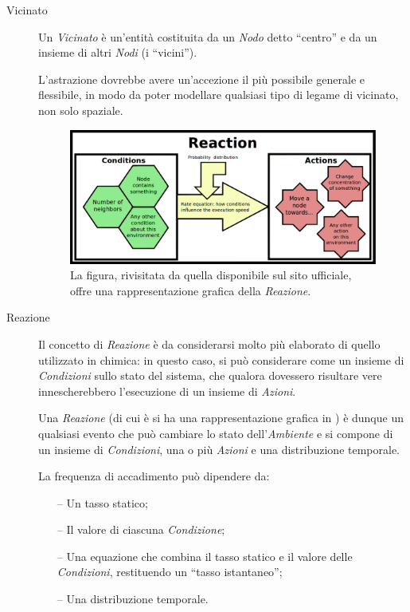 \begin{description}
                \item[Vicinato]\label{itm:neigh}
                    Un \emph{Vicinato} è un'entità costituita da un \emph{Nodo} detto ``centro'' e da un insieme di altri \emph{Nodi} (i ``vicini'').

                    L'astrazione dovrebbe avere un'accezione il più possibile generale e flessibile, in modo da poter modellare qualsiasi tipo di legame di vicinato, non solo spaziale.

                    \begin{figure}[htbp]
                        \centering
                        \includegraphics[scale=.35]{img/reaction}
                        \caption{%
                            La figura, rivisitata da quella disponibile sul sito ufficiale, offre una rappresentazione grafica della \emph{Reazione}.
                        }
                        \label{fig:react}
                    \end{figure}

                \item[Reazione]\label{itm:react}
                    Il concetto di \emph{Reazione} è da considerarsi molto più elaborato di quello utilizzato in chimica:
                    in questo caso, si può considerare come un insieme di \emph{Condizioni} sullo stato del sistema, che qualora dovessero risultare vere innescherebbero l'esecuzione di un insieme di \emph{Azioni}.

                    Una \emph{Reazione} (di cui è si ha una rappresentazione grafica in ) è dunque un qualsiasi evento che può cambiare lo stato dell'\emph{Ambiente} e si compone di un insieme di \emph{Condizioni}, una o più \emph{Azioni} e una distribuzione temporale.

                    La frequenza di accadimento può dipendere da:
                    \begin{itemize}
                        \item[--] Un tasso statico;
                        \item[--] Il valore di ciascuna \emph{Condizione};
                        \item[--] Una equazione che combina il tasso statico e il valore delle \emph{Condizioni}, restituendo un ``tasso istantaneo'';
                        \item[--] Una distribuzione temporale.
                    \end{itemize}


\end{description}
